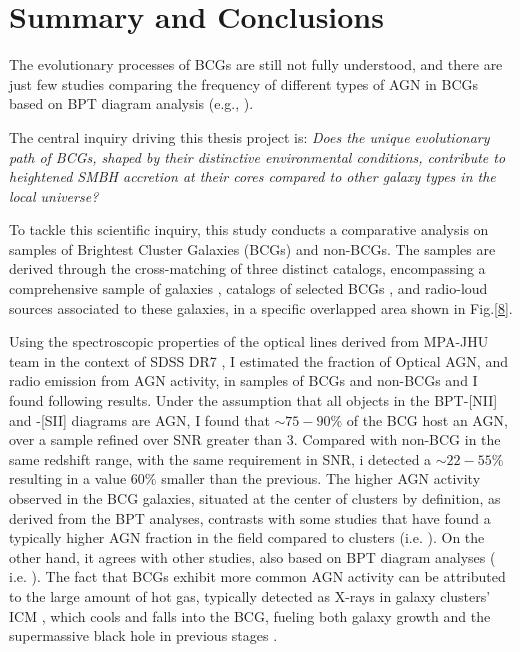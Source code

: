 \chapter*{Summary and Conclusions}

The evolutionary processes of BCGs are still not fully understood, and there are just few
studies comparing the frequency of different types of AGN in BCGs based on BPT diagram analysis (e.g., \cite{2019CoBAO..66..153F}).

The central inquiry driving this thesis project is: \textit{Does the unique evolutionary path of BCGs, shaped by their distinctive environmental conditions, contribute to heightened SMBH accretion at their cores compared to other galaxy types in the local universe?}

To tackle this scientific inquiry, this study conducts a comparative analysis on samples of Brightest Cluster Galaxies (BCGs) and non-BCGs. The samples are derived through the cross-matching of three distinct catalogs, encompassing a comprehensive sample of galaxies \cite{2009ApJS..182..543A}, catalogs of selected BCGs  \cite{2009yCat..73790867V}, and radio-loud sources \cite{2005MNRAS.362....9B} associated to these galaxies, in a specific overlapped area shown in Fig.\ref{8}.

Using the spectroscopic properties of the optical lines derived from MPA-JHU team in the context of SDSS DR7 \cite{mpa-sdss-dr7, 2009ApJS..182..543A}, I estimated the fraction of Optical AGN, and radio emission from AGN activity, in samples of BCGs and non-BCGs and I found following results.
Under the assumption that all objects in the BPT-[NII] and -[SII] diagrams are AGN, I found that $\sim75-90\%$ of the BCG host an AGN, over a sample refined over SNR greater than 3.
Compared with non-BCG in the same redshift range, with the same requirement in SNR, i detected a $\sim 22-55\%$ resulting in a value $60\%$ smaller than the previous. The higher AGN activity observed in the BCG galaxies, situated at the center of clusters by definition, as derived from the BPT analyses, contrasts with some studies that have found a typically higher AGN fraction in the field compared to clusters (i.e. \cite{2017MNRAS.472..409L}).  On the other hand, it agrees with other studies, also based on BPT diagram analyses ( i.e. \cite{2012A&A...538A..15H}).  The fact that BCGs exhibit more common AGN activity can be attributed to the large amount of hot gas, typically detected as X-rays in galaxy clusters' ICM , which cools and falls into the BCG, fueling both galaxy growth and the supermassive black hole in previous stages \cite{2012A&A...538A..15H}. 

